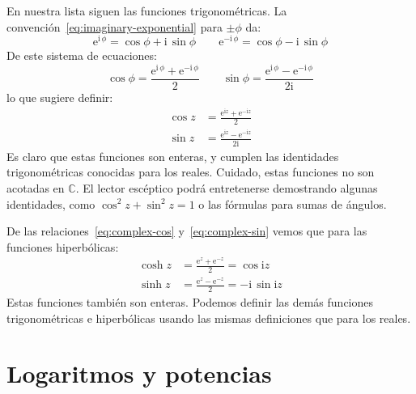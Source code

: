   En nuestra lista siguen las funciones trigonométricas.%
  La convención~\eqref{eq:imaginary-exponential}
  para \(\pm \phi\) da:
  \begin{equation*}
    \mathrm{e}^{\mathrm{i} \, \phi}
      = \cos \phi + \mathrm{i} \, \sin \phi
    \qquad
    \mathrm{e}^{- \mathrm{i} \, \phi}
      = \cos \phi - \mathrm{i} \, \sin \phi
  \end{equation*}
  De este sistema de ecuaciones:
  \begin{equation*}
    \cos \phi
      = \frac{\mathrm{e}^{\mathrm{i} \, \phi}
		+ \mathrm{e}^{- \mathrm{i} \, \phi}}
	     {2}
    \qquad
    \sin \phi
      = \frac{\mathrm{e}^{\mathrm{i} \, \phi}
		- \mathrm{e}^{- \mathrm{i} \, \phi}}
	     {2 \mathrm{i}}
  \end{equation*}
  lo que sugiere definir:
  \begin{align}
    \cos z
      &= \frac{\mathrm{e}^{\mathrm{i} z} + \mathrm{e}^{- \mathrm{i} z}}{2}
	    \label{eq:complex-cos} \\
    \sin z
      &= \frac{\mathrm{e}^{\mathrm{i} z} - \mathrm{e}^{- \mathrm{i} z}}
	      {2 \mathrm{i}}
	    \label{eq:complex-sin}
  \end{align}
  Es claro que estas funciones son enteras,
  y cumplen las identidades trigonométricas conocidas
  para los reales.
  Cuidado,
  estas funciones no son acotadas en \(\mathbb{C}\).
  El lector escéptico podrá entretenerse
  demostrando algunas identidades,
  como \(\cos^2 z + \sin^2 z = 1\)
  o las fórmulas para sumas de ángulos.

  De las relaciones~\eqref{eq:complex-cos} y~\eqref{eq:complex-sin}
  vemos que para las funciones hiperbólicas:%
  \begin{align}
    \cosh z
      &= \frac{\mathrm{e}^z + \mathrm{e}^{- z}}{2}
       = \cos \mathrm{i} z
	    \label{eq:complex-cosh} \\
    \sinh z
      &= \frac{\mathrm{e}^z  - \mathrm{e}^{- z}}{2}
       = - \mathrm{i} \, \sin \mathrm{i} z
	    \label{eq:complex-sinh}
  \end{align}
  Estas funciones también son enteras.
  Podemos definir las demás funciones trigonométricas
  e hiperbólicas usando las mismas definiciones que para los reales.

\section{Logaritmos y potencias}
\label{sec:complex-logarithm}

